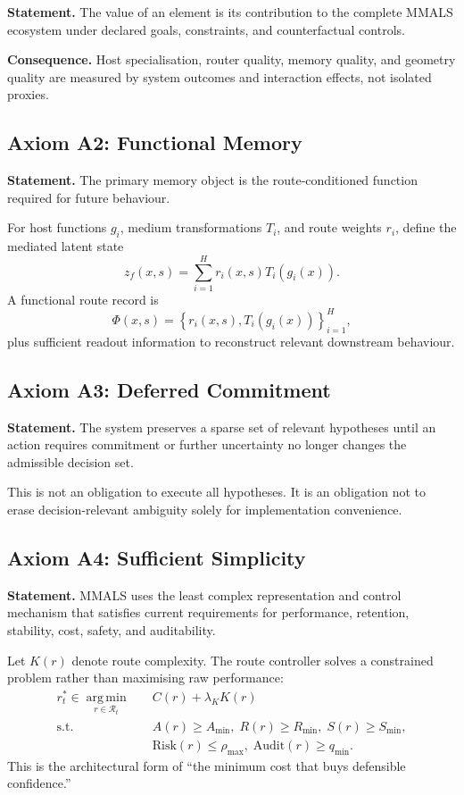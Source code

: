 \documentclass[10pt]{article}
\newcommand{\Rset}{\mathcal{R}}
\newcommand{\argmin}{\operatorname*{arg\,min}}
\begin{document}
\textbf{Statement.} The value of an element is its contribution to the complete MMALS ecosystem under declared goals, constraints, and counterfactual controls.

\textbf{Consequence.} Host specialisation, router quality, memory quality, and geometry quality are measured by system outcomes and interaction effects, not isolated proxies.

\subsection{Axiom A2: Functional Memory}

\textbf{Statement.} The primary memory object is the route-conditioned function required for future behaviour.

For host functions $g_i$, medium transformations $T_i$, and route weights $r_i$, define the mediated latent state
\begin{equation}
  z_f(x,s)=\sum_{i=1}^{H}r_i(x,s)T_i(g_i(x)).
  \label{eq:mediated}
\end{equation}
A functional route record is
\begin{equation}
  \Phi(x,s)=\left\{r_i(x,s),T_i(g_i(x))\right\}_{i=1}^{H},
  \label{eq:functionalroute}
\end{equation}
plus sufficient readout information to reconstruct relevant downstream behaviour.

\subsection{Axiom A3: Deferred Commitment}

\textbf{Statement.} The system preserves a sparse set of relevant hypotheses until an action requires commitment or further uncertainty no longer changes the admissible decision set.

This is not an obligation to execute all hypotheses. It is an obligation not to erase decision-relevant ambiguity solely for implementation convenience.

\subsection{Axiom A4: Sufficient Simplicity}

\textbf{Statement.} MMALS uses the least complex representation and control mechanism that satisfies current requirements for performance, retention, stability, cost, safety, and auditability.

Let $K(r)$ denote route complexity. The route controller solves a constrained problem rather than maximising raw performance:
\begin{align}
  r_t^* \in \argmin_{r\in\Rset_t} \quad & C(r)+\lambda_K K(r) \\
  \text{s.t.}\quad & A(r)\ge A_{\min},\; R(r)\ge R_{\min},\; S(r)\ge S_{\min},\nonumber\\
  & \mathrm{Risk}(r)\le \rho_{\max},\; \mathrm{Audit}(r)\ge q_{\min}.
  \label{eq:confidenceconstrained}
\end{align}
This is the architectural form of ``the minimum cost that buys defensible confidence.''
\end{document}

